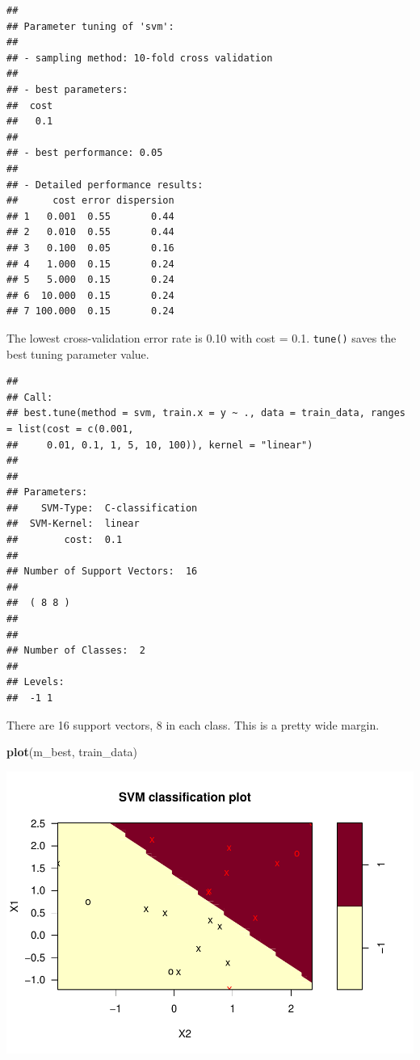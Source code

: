 \documentclass[
]{book}
\newenvironment{Shaded}{\begin{snugshade}}{\end{snugshade}}
\newcommand{\KeywordTok}[1]{\textcolor[rgb]{0.13,0.29,0.53}{\textbf{#1}}}
\newcommand{\NormalTok}[1]{#1}
\newcommand{\OperatorTok}[1]{\textcolor[rgb]{0.81,0.36,0.00}{\textbf{#1}}}
\newcommand{\StringTok}[1]{\textcolor[rgb]{0.31,0.60,0.02}{#1}}
\begin{document}
\begin{verbatim}
## 
## Parameter tuning of 'svm':
## 
## - sampling method: 10-fold cross validation 
## 
## - best parameters:
##  cost
##   0.1
## 
## - best performance: 0.05 
## 
## - Detailed performance results:
##      cost error dispersion
## 1   0.001  0.55       0.44
## 2   0.010  0.55       0.44
## 3   0.100  0.05       0.16
## 4   1.000  0.15       0.24
## 5   5.000  0.15       0.24
## 6  10.000  0.15       0.24
## 7 100.000  0.15       0.24
\end{verbatim}

The lowest cross-validation error rate is 0.10 with cost = 0.1. \texttt{tune()} saves the best tuning parameter value.

\begin{Shaded}
\end{Shaded}

\begin{verbatim}
## 
## Call:
## best.tune(method = svm, train.x = y ~ ., data = train_data, ranges = list(cost = c(0.001, 
##     0.01, 0.1, 1, 5, 10, 100)), kernel = "linear")
## 
## 
## Parameters:
##    SVM-Type:  C-classification 
##  SVM-Kernel:  linear 
##        cost:  0.1 
## 
## Number of Support Vectors:  16
## 
##  ( 8 8 )
## 
## 
## Number of Classes:  2 
## 
## Levels: 
##  -1 1
\end{verbatim}

There are 16 support vectors, 8 in each class. This is a pretty wide margin.

\begin{Shaded}
\begin{Highlighting}[]
\KeywordTok{plot}\NormalTok{(m_best, train_data)}
\end{Highlighting}
\end{Shaded}

\includegraphics{data-sci_files/figure-latex/unnamed-chunk-135-1.pdf}
\end{document}
